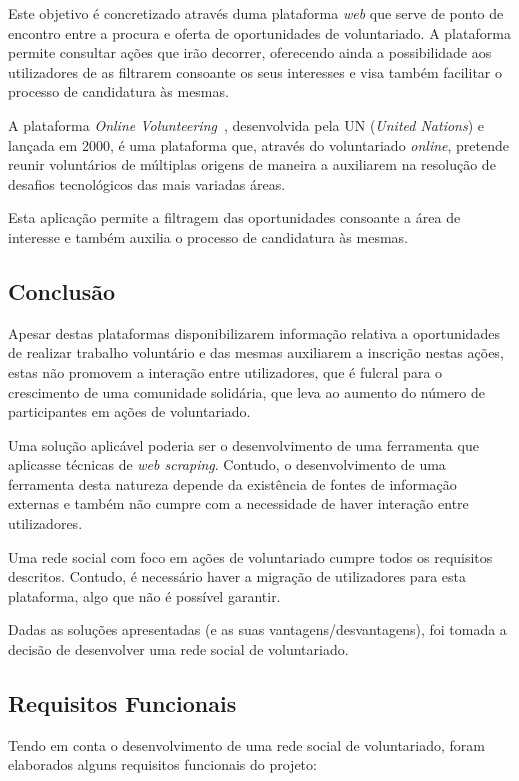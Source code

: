 Este objetivo é concretizado através duma plataforma \textit{web} que serve de ponto de encontro entre a procura e oferta de oportunidades de voluntariado. A plataforma permite consultar ações que irão decorrer, oferecendo ainda a possibilidade aos utilizadores de as filtrarem consoante os seus interesses e visa também facilitar o processo de candidatura às mesmas. \medskip

A plataforma \textit{Online Volunteering}~\cite{online_volunteering}, desenvolvida pela UN (\textit{United Nations}) e lançada em 2000, é uma plataforma que, através do voluntariado \textit{online}, pretende reunir voluntários de múltiplas origens de maneira a auxiliarem na resolução de desafios tecnológicos das mais variadas áreas. \medskip

Esta aplicação permite a filtragem das oportunidades consoante a área de interesse e também auxilia o processo de candidatura às mesmas. 

\subsection{Conclusão}

Apesar destas plataformas disponibilizarem informação relativa a oportunidades de realizar trabalho voluntário e das mesmas auxiliarem a inscrição nestas ações, estas não promovem a interação entre utilizadores, que é fulcral para o crescimento de uma comunidade solidária, que leva ao aumento do número de participantes em ações de voluntariado. \medskip

Uma solução aplicável poderia ser o desenvolvimento de uma ferramenta que aplicasse técnicas de \textit{web scraping}. Contudo, o desenvolvimento de uma ferramenta desta natureza depende da existência de fontes de informação externas e também não cumpre com a necessidade de haver interação entre utilizadores. \medskip

Uma rede social com foco em ações de voluntariado cumpre todos os requisitos descritos. Contudo, é necessário haver a migração de utilizadores para esta plataforma, algo que não é possível garantir. \medskip

Dadas as soluções apresentadas (e as suas vantagens/desvantagens), foi tomada a decisão de desenvolver uma rede social de voluntariado.

\subsection{Requisitos Funcionais}
Tendo em conta o desenvolvimento de uma rede social de voluntariado, foram elaborados alguns requisitos funcionais do projeto:


